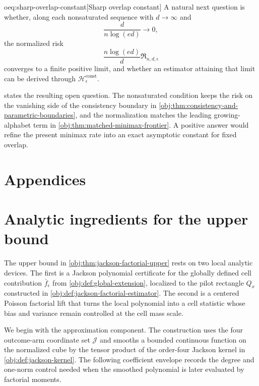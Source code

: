 \documentclass[11pt]{article}
\begin{document}
\begin{remarkv}{oeq:sharp-overlap-constant}[Sharp overlap constant]
A natural next question is whether, along each nonsaturated sequence with \(d\to\infty\) and
\[
\frac{d}{n\log(ed)}\to0,
\]
the normalized risk
\[
\frac{n\log(ed)}{d}\mathfrak R_{n,d,\epsilon}
\]
converges to a finite positive limit, and whether an estimator attaining that limit can be derived through \(\mathscr H_\epsilon^{\mathrm{const}}\).
\end{remarkv}

 states the resulting open question. The nonsaturated condition keeps the risk on the vanishing side of the consistency boundary in \cref{obj:thm:consistency-and-parametric-boundaries}, and the normalization matches the leading growing-alphabet term in \cref{obj:thm:matched-minimax-frontier}. A positive answer would refine the present minimax rate into an exact asymptotic constant for fixed overlap.


\appendix

\section*{Appendices}

\section{Analytic ingredients for the upper bound}

The upper bound in \cref{obj:thm:jackson-factorial-upper} rests on two local analytic devices. The first is a Jackson polynomial certificate for the globally defined cell contribution \(\bar f_\epsilon\) from \cref{obj:def:global-extension}, localized to the pilot rectangle \(Q_x\) constructed in \cref{obj:def:jackson-factorial-estimator}. The second is a centered Poisson factorial lift that turns the local polynomial into a cell statistic whose bias and variance remain controlled at the cell mass scale.

We begin with the approximation component. The construction uses the four outcome-arm coordinate set \(\mathcal J\) and smooths a bounded continuous function on the normalized cube by the tensor product of the order-four Jackson kernel in \cref{obj:def:jackson-kernel}. The following coefficient envelope records the degree and one-norm control needed when the smoothed polynomial is later evaluated by factorial moments.
\end{document}
